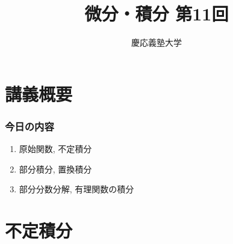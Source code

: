 \documentclass[dvipdfmx,cjk,10.2pt]{beamer}
\theoremstyle{definition}
\begin{document}
\title{微分・積分 第11回} 
\author{慶応義塾大学}            %
\date{}



\begin{frame}                  %
\titlepage                     %
\end{frame}








\section{講義概要}


\begin{frame}
\frametitle{今日の内容}



\begin{enumerate}
\item 原始関数, 不定積分
\item 部分積分, 置換積分
\item 部分分数分解, 有理関数の積分
\end{enumerate} 



\end{frame}








\section{不定積分}
\end{document}
